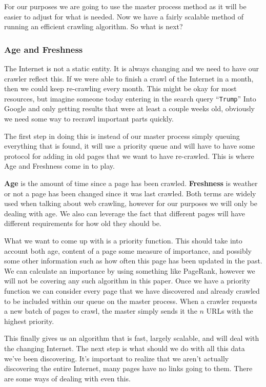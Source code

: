 \documentclass{article}
\begin{document}
	For our purposes we are going to use the master process method as it will be easier to adjust for what is needed. Now we have a fairly scalable method of running an efficient crawling algorithm. So what is next?
	
	\subsubsection{Age and Freshness}
	The Internet is not a static entity. It is always changing and we need to have our crawler reflect this. If we were able to finish a crawl of the Internet in a month, then we could keep re-crawling every month. This might be okay for most resources, but imagine someone today entering in the search query ``\verb|Trump|'' Into Google and only getting results that were at least a couple weeks old, obviously we need some way to recrawl important parts quickly.
	
	The first step in doing this is instead of our master process simply queuing everything that is found, it will use a priority queue and will have to have some protocol for adding in old pages that we want to have re-crawled. This is where Age and Freshness come in to play.
	
	\textbf{Age} is the amount of time since a page has been crawled. \textbf{Freshness} is weather or not a page has been changed since it was last crawled. Both terms are widely used when talking about web crawling, however for our purposes we will only be dealing with age. We also can leverage the fact that different pages will have different requirements for how old they should be.
	
	What we want to come up with is a priority function. This should take into account both age, content of a page some measure of importance, and possibly some other information such as how often this page has been updated in the past. We can calculate an importance by using something like PageRank, however we will not be covering any such algorithm in this paper. Once we have a priority function we can consider every page that we have discovered and already crawled to be included within our queue on the master process. When a crawler requests a new batch of pages to crawl, the master simply sends it the $n$ URLs with the highest priority.
	
	This finally gives us an algorithm that is fast, largely scalable, and will deal with the changing Internet. The next step is what should we do with all this data we've been discovering. It's important to realize that we aren't actually discovering the entire Internet, many pages have no links going to them. There are some ways of dealing with even this. 
	
\end{document}
